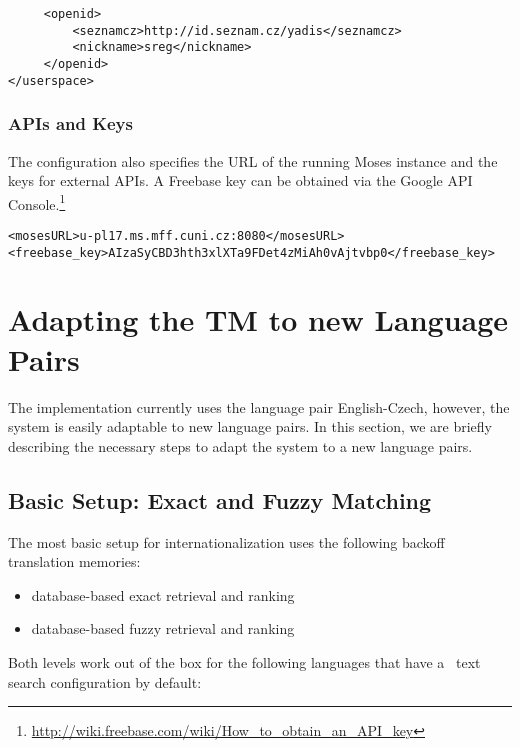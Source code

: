 \begin{lstlisting}
     <openid>
         <seznamcz>http://id.seznam.cz/yadis</seznamcz>
         <nickname>sreg</nickname>
     </openid>
</userspace>
\end{lstlisting}


\subsubsection{APIs and Keys}

The configuration also specifies the URL of the running Moses instance and the keys for external APIs. A Freebase key can be obtained via the Google API Console.\footnote{\url{http://wiki.freebase.com/wiki/How_to_obtain_an_API_key}}

\begin{lstlisting}
<mosesURL>u-pl17.ms.mff.cuni.cz:8080</mosesURL>
<freebase_key>AIzaSyCBD3hth3xlXTa9FDet4zMiAh0vAjtvbp0</freebase_key>
\end{lstlisting}


\section{Adapting the TM to new Language Pairs}
\label{sec:internationalization}

The implementation currently uses the language pair English-Czech, however, the system is easily adaptable to new language pairs. In this section, we are briefly describing the necessary steps to adapt the system to a new language pairs.

\subsection{Basic Setup: Exact and Fuzzy Matching}

The most basic setup for internationalization uses the following backoff translation memories:

\begin{itemize}
	\item database-based exact retrieval and ranking
	\item database-based fuzzy retrieval and ranking
\end{itemize}

Both levels work out of the box for the following languages that have a \postgres~text search configuration by default:


